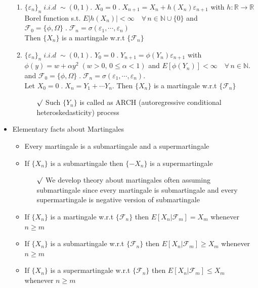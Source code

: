 \documentclass[12pt, A4]{article}
\newcommand{\rmk}{$\surd$}
\newcommand{\N}{\mathbb{N}}
\newcommand{\R}{\mathbb{R}}
\newcommand{\F}{\mathcal{F}}
\newcommand{\foranyn}{\quad \forall \, n\in \N}
\begin{document}
\begin{itemize}
\begin{enumerate}
		\item $\{\varepsilon_n\}_n\; i.i.d\;\sim (0,1)$. $X_0=0\;.\; X_{n+1}=X_n+h(X_n)\varepsilon_{n+1}$ with $h:\R\rightarrow \R$ Borel function s.t. $E|h(X_n)|<\infty\foranyn\cup\{0\}$ and $\F_0=\{\phi, \Omega\}\;.\; \F_n=\sigma(\varepsilon_1, \cdots, \varepsilon_n)$ \\ Then $\{X_n\}$ is a martingale w.r.t $\{\F_n\}$
		\item $\{\varepsilon_n\}_n\; i.i.d\; \sim (0,1)$. $Y_0=0\;. \; Y_{n+1}=\phi(Y_n)\varepsilon_{n+1}$ with $\phi(y)=w+\alpha y^2\;(w>0, \, 0\leq \alpha<1)$ and $E[\phi(Y_n)]<\infty \foranyn$. and $\F_0=\{\phi, \Omega\}\;.\; \F_n=\sigma(\varepsilon_1, \cdots, \varepsilon_n)$. \\Let $X_0=0\;.\; X_n=Y_1+\cdots Y_n$. Then $\{X_n\}$ is a martingale w.r.t $\{\F_n\}$
		\begin{itemize}
			\item[\rmk] Such $\{Y_n\}$ is called as ARCH (autoregressive conditional heteroskedasticity) process
		\end{itemize}
	\end{enumerate}
	\item Elementary facts about Martingales
	\begin{itemize}
		\item Every martingale is a submartingale and a supermartingale
		\item If $\{X_n\}$ is a submartingale then $\{-X_n\}$ is a supermartingale
		\begin{itemize}
			\item[\rmk] We develop theory about martingales often assuming submartingale since every martingale is submartingale and every supermartingale is negative version of submartingale
		\end{itemize}
		\item If $\{X_n\}$ is a martingale w.r.t $\{\F_n\}$ then $E[X_n|\F_m]=X_m$ whenever $n\geq m$
		\item If $\{X_n\}$ is a submartingale w.r.t $\{\F_n\}$ then $E[X_n|\F_m]\geq X_m$ whenever $n\geq m$
		\item If $\{X_n\}$ is a supermartingale w.r.t $\{\F_n\}$ then $E[X_n|\F_m]\leq X_m$ whenever $n\geq m$
	\end{itemize}


\end{itemize}
\end{document}
